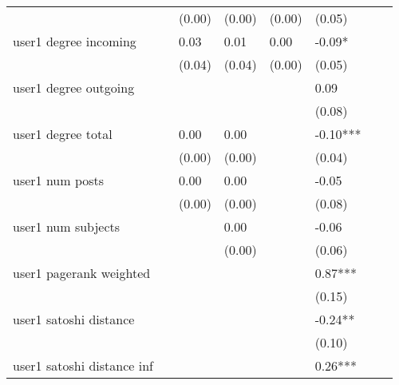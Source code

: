 \begin{table}
\begin{center}
\begin{tabular}{llllllll}
                                               &         & (0.00)  & (0.00)  & (0.00)  & (0.05)      &           &          \\
user1 degree incoming                          &         & 0.03    & 0.01    & 0.00    & -0.09*      &           &          \\
                                               &         & (0.04)  & (0.04)  & (0.00)  & (0.05)      &           &          \\
user1 degree outgoing                          &         &         &         &         & 0.09        &           &          \\
                                               &         &         &         &         & (0.08)      &           &          \\
user1 degree total                             &         & 0.00    & 0.00    &         & -0.10***    &           &          \\
                                               &         & (0.00)  & (0.00)  &         & (0.04)      &           &          \\
user1 num posts                                &         & 0.00    & 0.00    &         & -0.05       &           &          \\
                                               &         & (0.00)  & (0.00)  &         & (0.08)      &           &          \\
user1 num subjects                             &         &         & 0.00    &         & -0.06       &           &          \\
                                               &         &         & (0.00)  &         & (0.06)      &           &          \\
user1 pagerank weighted                        &         &         &         &         & 0.87***     &           &          \\
                                               &         &         &         &         & (0.15)      &           &          \\
user1 satoshi distance                         &         &         &         &         & -0.24**     &           &          \\
                                               &         &         &         &         & (0.10)      &           &          \\
user1 satoshi distance inf                     &         &         &         &         & 0.26***     &           &          \\

\end{tabular}
\end{center}
\end{table}
